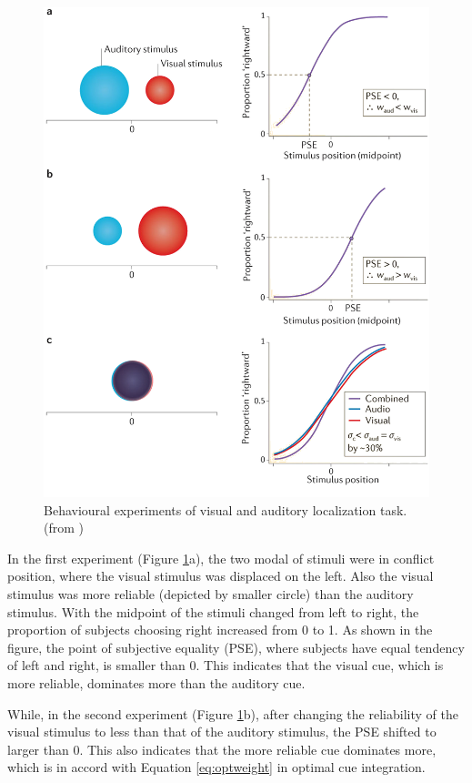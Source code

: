 \documentclass{article}[11pt]
\begin{document}
\begin{figure}[htpb]
  \centering
  \includegraphics[width=.9\textwidth]{fetsch-visaudloc}
  \caption{Behavioural experiments of visual and auditory localization task. (from \cite{fetsch_bridging_2013})}
  \label{fig:visaudloc}
\end{figure}

In the first experiment (Figure \ref{fig:visaudloc}a), the two modal of stimuli were in conflict position, where the visual stimulus was displaced on the left. Also the visual stimulus was more reliable (depicted by smaller circle) than the auditory stimulus. With the midpoint of the stimuli changed from left to right, the proportion of subjects choosing right increased from 0 to 1. As shown in the figure, the point of subjective equality (PSE), where subjects have equal tendency of left and right, is smaller than 0. This indicates that the visual cue, which is more reliable, dominates more than the auditory cue.

While, in the second experiment (Figure \ref{fig:visaudloc}b), after changing the reliability of the visual stimulus to less than that of the auditory stimulus, the PSE shifted to larger than 0. This also indicates that the more reliable cue dominates more, which is in accord with Equation \ref{eq:optweight} in optimal cue integration.
\end{document}
